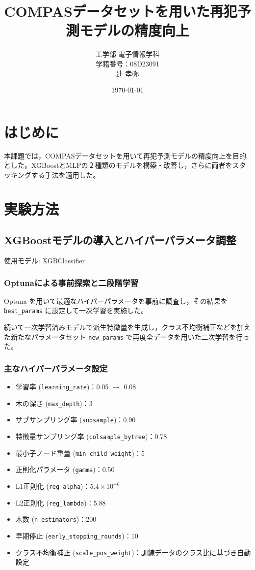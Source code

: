 \documentclass[a4paper,11pt]{article}
\title{COMPASデータセットを用いた再犯予測モデルの精度向上}
\author{工学部 電子情報学科\\学籍番号：08D23091\\辻 孝弥}
\date{\today}
\begin{document}
\maketitle

\section{はじめに}
本課題では，COMPASデータセットを用いて再犯予測モデルの精度向上を目的とした。XGBoostとMLPの２種類のモデルを構築・改善し，さらに両者をスタッキングする手法を適用した。

\section{実験方法}
\subsection{XGBoostモデルの導入とハイパーパラメータ調整}
使用モデル: XGBClassifier

\subsubsection{Optunaによる事前探索と二段階学習}
Optuna を用いて最適なハイパーパラメータを事前に調査し，その結果を \texttt{best\_params} に設定して一次学習を実施した。\par
続いて一次学習済みモデルで派生特徴量を生成し，クラス不均衡補正などを加えた新たなパラメータセット \texttt{new\_params} で再度全データを用いた二次学習を行った。

\subsubsection{主なハイパーパラメータ設定}
\begin{itemize}[nosep]
  \item 学習率 (\texttt{learning\_rate})：0.05 $\rightarrow$ 0.08
  \item 木の深さ (\texttt{max\_depth})：3
  \item サブサンプリング率 (\texttt{subsample})：0.90
  \item 特徴量サンプリング率 (\texttt{colsample\_bytree})：0.78
  \item 最小子ノード重量 (\texttt{min\_child\_weight})：5
  \item 正則化パラメータ (\texttt{gamma})：0.50
  \item L1正則化 (\texttt{reg\_alpha})：$5.4 \times 10^{-6}$
  \item L2正則化 (\texttt{reg\_lambda})：5.88
  \item 木数 (\texttt{n\_estimators})：200
  \item 早期停止 (\texttt{early\_stopping\_rounds})：10
  \item クラス不均衡補正 (\texttt{scale\_pos\_weight})：訓練データのクラス比に基づき自動設定
\end{itemize}
\end{document}
